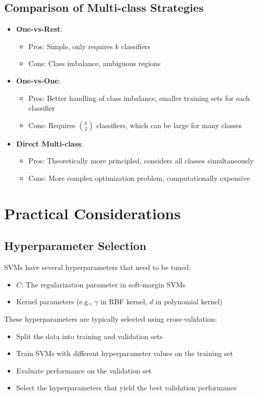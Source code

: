 \documentclass{article}
\begin{document}
\subsection{Comparison of Multi-class Strategies}
\begin{itemize}
    \item \textbf{One-vs-Rest}:
    \begin{itemize}
        \item Pros: Simple, only requires $k$ classifiers
        \item Cons: Class imbalance, ambiguous regions
    \end{itemize}
    \item \textbf{One-vs-One}:
    \begin{itemize}
        \item Pros: Better handling of class imbalance, smaller training sets for each classifier
        \item Cons: Requires $\binom{k}{2}$ classifiers, which can be large for many classes
    \end{itemize}
    \item \textbf{Direct Multi-class}:
    \begin{itemize}
        \item Pros: Theoretically more principled, considers all classes simultaneously
        \item Cons: More complex optimization problem, computationally expensive
    \end{itemize}
\end{itemize}

\section{Practical Considerations}

\subsection{Hyperparameter Selection}
SVMs have several hyperparameters that need to be tuned:
\begin{itemize}
    \item $C$: The regularization parameter in soft-margin SVMs
    \item Kernel parameters (e.g., $\gamma$ in RBF kernel, $d$ in polynomial kernel)
\end{itemize}

These hyperparameters are typically selected using cross-validation:
\begin{itemize}
    \item Split the data into training and validation sets
    \item Train SVMs with different hyperparameter values on the training set
    \item Evaluate performance on the validation set
    \item Select the hyperparameters that yield the best validation performance
\end{itemize}
\end{document}
